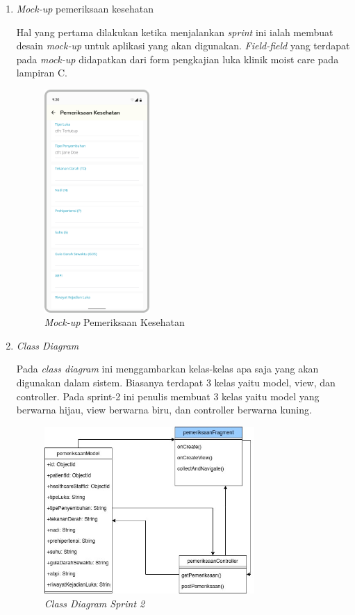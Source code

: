 \begin{enumerate}
\item \textit{Mock-up} pemeriksaan kesehatan

Hal yang pertama dilakukan ketika menjalankan \textit{sprint} ini ialah membuat desain \textit{mock-up} untuk aplikasi yang akan digunakan. \textit{Field-field} yang terdapat pada \textit{mock-up} didapatkan dari form pengkajian luka klinik moist care pada lampiran C.
	\begin{figure}[H]
		\centering
		\includegraphics[keepaspectratio, width=4cm]{gambar/tampilan_pemeriksaan_kesehatan}
		\caption{\textit{Mock-up} Pemeriksaan Kesehatan}
		\label{gambar:tampilan_pemeriksaan_kesehatan}
	\end{figure}
	
	\item \textit{Class Diagram}
	
	Pada \textit{class diagram} ini menggambarkan kelas-kelas apa saja yang akan digunakan dalam sistem. Biasanya terdapat 3 kelas yaitu model, view, dan controller. Pada sprint-2 ini penulis membuat 3 kelas yaitu model yang berwarna hijau, view berwarna biru, dan controller berwarna kuning.
	\begin{figure}[H]
		\centering
		\includegraphics[keepaspectratio, width=8cm]{gambar/class_diagram_sprint_2}
		\caption{\textit{Class Diagram Sprint 2}}
		\label{gambar:class_diagram_sprint_2}
	\end{figure}
	

\end{enumerate}
